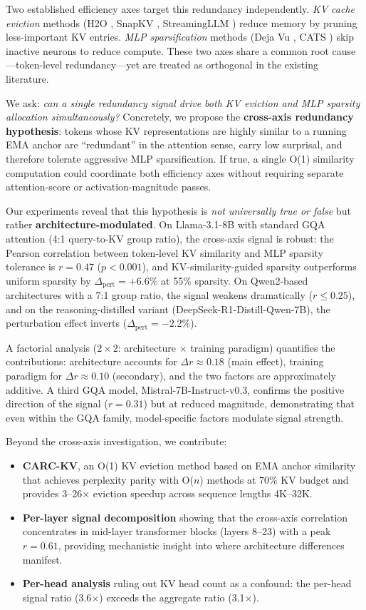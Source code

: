 \documentclass[11pt,a4paper]{article}
\begin{document}
Two established efficiency axes target this redundancy independently.
\emph{KV cache eviction} methods (H2O \cite{zhang2024h2o}, SnapKV \cite{li2024snapkv}, StreamingLLM \cite{xiao2024streamingllm}) reduce memory by pruning less-important KV entries.
\emph{MLP sparsification} methods (Deja Vu \cite{liu2023dejavu}, CATS \cite{lee2024cats}) skip inactive neurons to reduce compute.
These two axes share a common root cause---token-level redundancy---yet are treated as orthogonal in the existing literature.

We ask: \emph{can a single redundancy signal drive both KV eviction and MLP sparsity allocation simultaneously?}
Concretely, we propose the \textbf{cross-axis redundancy hypothesis}: tokens whose KV representations are highly similar to a running EMA anchor are ``redundant'' in the attention sense, carry low surprisal, and therefore tolerate aggressive MLP sparsification.
If true, a single O(1) similarity computation could coordinate both efficiency axes without requiring separate attention-score or activation-magnitude passes.

Our experiments reveal that this hypothesis is \emph{not universally true or false} but rather \textbf{architecture-modulated}.
On Llama-3.1-8B with standard GQA attention (4:1 query-to-KV group ratio), the cross-axis signal is robust: the Pearson correlation between token-level KV similarity and MLP sparsity tolerance is $r{=}0.47$ ($p{<}0.001$), and KV-similarity-guided sparsity outperforms uniform sparsity by $\Delta_\text{pert}{=}{+}6.6\%$ at 55\% sparsity.
On Qwen2-based architectures with a 7:1 group ratio, the signal weakens dramatically ($r{\le}0.25$), and on the reasoning-distilled variant (DeepSeek-R1-Distill-Qwen-7B), the perturbation effect inverts ($\Delta_\text{pert}{=}{-}2.2\%$).

A factorial analysis ($2\times 2$: architecture $\times$ training paradigm) quantifies the contributions: architecture accounts for $\Delta r{\approx}0.18$ (main effect), training paradigm for $\Delta r{\approx}0.10$ (secondary), and the two factors are approximately additive.
A third GQA model, Mistral-7B-Instruct-v0.3, confirms the positive direction of the signal ($r{=}0.31$) but at reduced magnitude, demonstrating that even within the GQA family, model-specific factors modulate signal strength.

Beyond the cross-axis investigation, we contribute:
\begin{itemize}
    \item \textbf{CARC-KV}, an O(1) KV eviction method based on EMA anchor similarity that achieves perplexity parity with O($n$) methods at 70\% KV budget and provides 3--26$\times$ eviction speedup across sequence lengths 4K--32K.
    \item \textbf{Per-layer signal decomposition} showing that the cross-axis correlation concentrates in mid-layer transformer blocks (layers 8--23) with a peak $r{=}0.61$, providing mechanistic insight into where architecture differences manifest.
    \item \textbf{Per-head analysis} ruling out KV head count as a confound: the per-head signal ratio (3.6$\times$) exceeds the aggregate ratio (3.1$\times$).
\end{itemize}
\end{document}
